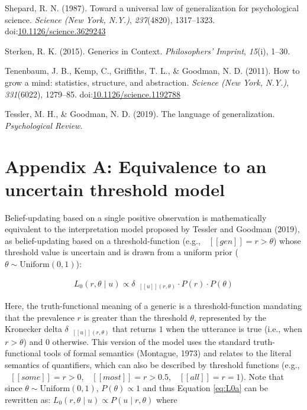 \documentclass[floatsintext,doc]{apa6}
\begin{document}
\leavevmode\hypertarget{ref-Shepard1987}{}%
Shepard, R. N. (1987). Toward a universal law of generalization for psychological science. \emph{Science (New York, N.Y.)}, \emph{237}(4820), 1317--1323. doi:\href{https://doi.org/10.1126/science.3629243}{10.1126/science.3629243}

\leavevmode\hypertarget{ref-Sterken2015}{}%
Sterken, R. K. (2015). Generics in Context. \emph{Philosophers' Imprint}, \emph{15}(i), 1--30.

\leavevmode\hypertarget{ref-Tenenbaum2011}{}%
Tenenbaum, J. B., Kemp, C., Griffiths, T. L., \& Goodman, N. D. (2011). How to grow a mind: statistics, structure, and abstraction. \emph{Science (New York, N.Y.)}, \emph{331}(6022), 1279--85. doi:\href{https://doi.org/10.1126/science.1192788}{10.1126/science.1192788}

\leavevmode\hypertarget{ref-Tessler2019psychrev}{}%
Tessler, M. H., \& Goodman, N. D. (2019). The language of generalization. \emph{Psychological Review}.

\newpage
\section{Appendix A: Equivalence to an uncertain threshold model}

Belief-updating based on a single positive observation is mathematically equivalent to the interpretation model proposed by Tessler and Goodman (2019), as belief-updating based on a threshold-function (e.g., \(\mbox{ $[\![ gen ]\!]$} = r > \theta\)) whose threshold value is uncertain and is drawn from a uniform prior (\(\theta \sim \text{Uniform}(0, 1)\)):

\begin{align}
L_0(r, \theta \mid u) \propto {\delta_{\mbox{ $[\![ u ]\!]$}(r, \theta)} \cdot P(r) \cdot P(\theta)} \label{eq:L0a}
\end{align}

Here, the truth-functional meaning of a generic is a threshold-function mandating that the prevalence \(r\) is greater than the threshold \(\theta\), represented by the Kronecker delta \(\delta_{\mbox{ $[\![ u ]\!]$}(r, \theta)}\) that returns \(1\) when the utterance is true (i.e., when \(r > \theta\)) and \(0\) otherwise.
%
%
This version of the model uses the standard truth-functional tools of formal semantics (Montague, 1973) and relates to the literal semantics of quantifiers, which can also be described by threshold functions (e.g., \(\mbox{ $[\![ some ]\!]$} = r > 0\), \(\mbox{ $[\![ most ]\!]$} = r > 0.5\), \(\mbox{ $[\![ all ]\!]$} = r = 1\)).
Note that since \(\theta \sim \text{Uniform}(0, 1)\),  \(P(\theta) \propto 1\)  and thus Equation \ref{eq:L0a} can be rewritten as: \(L_0(r, \theta \mid u) \propto P(u \mid r, \theta)\) where
\end{document}
